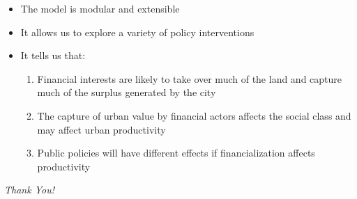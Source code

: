\documentclass[hide notes=show/only]{beamer} %
\begin{document}
\begin{frame}{} 

\begin{itemize} \Large
\item The model is modular and extensible
\item It allows us to explore a variety of policy interventions 
\item It tells us that: 
\begin{enumerate}
    \item Financial interests are likely to take over much of the land and capture much of the surplus generated by the city
    \item The capture of urban value by financial actors affects the social class and may affect urban productivity
    \item Public policies will have different effects if financialization affects productivity
    \end{enumerate}
\end{itemize}
\end{frame}
\begin{frame}
  \centering \Large
  \emph{Thank You!}
\end{frame}
\end{document}

